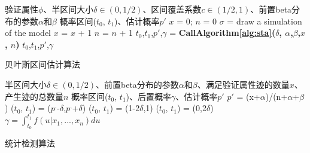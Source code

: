 \begin{algorithm}
\begin{algorithmic}[1]
\REQUIRE 验证属性$\phi$、半区间大小$\delta \in (0, 1/2)$、区间覆盖系数$c \in (1/2, 1)$、前置beta分布的参数$\alpha$和$\beta$
\ENSURE 概率区间($t_0$, $t_1$)、估计概率$p'$
\STATE $x$ = 0; $n$ = 0
\LOOP
        \STATE $\sigma$ = draw a simulation of the model
        \IF{$\sigma\models\phi$}
        \STATE $x$ = $x$ + 1
        \ENDIF
        \STATE $n$ = $n$ + 1
        \STATE $t_0$,$t_1$,$p'$,$\gamma$ = \textbf{CallAlgorithm\ref{alg:sta}($\delta$, $\alpha$,$\beta$,$x$, $n$)}
        \RETURN $t_0$,$t_1$,$p'$,$\gamma$
        \ENDIF
\ENDLOOP
\end{algorithmic}
\caption{贝叶斯区间估计算法}
\label{alg:bie}
\end{algorithm}


\begin{algorithm}[t]
\begin{algorithmic}[1]
\REQUIRE 半区间大小$\delta \in (0, 1/2)$、前置beta分布的参数$\alpha$和$\beta$、满足验证属性迹的数量$x$、产生迹的总数量$n$
\ENSURE 概率区间($t_0$, $t_1$)、后置概率$\gamma$、估计概率$p'$
\STATE $p'$ = (x+$\alpha$)/(n+$\alpha$+$\beta$)
\STATE ($t_0$, $t_1$) = ($p^,$-$\delta$,$p^,$+$\delta$)
        \STATE ($t_0$, $t_1$) = (1-2$\delta$,1)
        \STATE ($t_0$, $t_1$) = (0,2$\delta$)
        \ENDIF
        \STATE $\gamma=\int_{t_0}^{t_1} {f(u|x_1,...,x_n)du}$
\end{algorithmic}
\caption{统计检测算法}
\label{alg:sta}
\end{algorithm}
